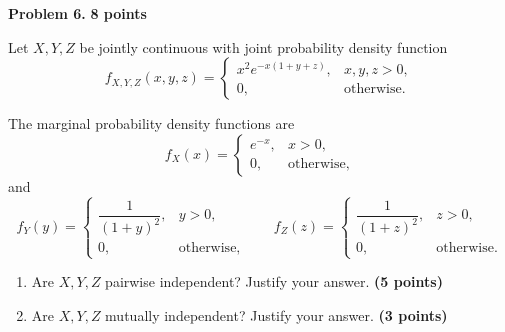 \documentclass[11pt]{article}
\begin{document}
\newpage


\begin{problemheader}
\textbf{Problem 6.} \hfill \textbf{8 points}
\end{problemheader}

Let \(X,Y,Z\) be jointly continuous with joint probability density function
\[
f_{X,Y,Z}(x,y,z)
=
\begin{cases}
x^2e^{-x(1+y+z)}, & x,y,z>0,\\
0, & \text{otherwise}.
\end{cases}
\]

The marginal probability density functions are
\[
f_X(x)
=
\begin{cases}
e^{-x}, & x>0,\\
0, & \text{otherwise},
\end{cases}
\]
and
\[
f_Y(y)
=
\begin{cases}
\dfrac{1}{(1+y)^2}, & y>0,\\
0, & \text{otherwise},
\end{cases}
\qquad
f_Z(z)
=
\begin{cases}
\dfrac{1}{(1+z)^2}, & z>0,\\
0, & \text{otherwise}.
\end{cases}
\]

\begin{enumerate}[label=(\alph*),leftmargin=*,itemsep=0.8em]

    \item Are \(X,Y,Z\) pairwise independent? Justify your answer.
    \hfill \textbf{(5 points)}

    \item Are \(X,Y,Z\) mutually independent? Justify your answer.
    \hfill \textbf{(3 points)}

\end{enumerate}
\end{document}
